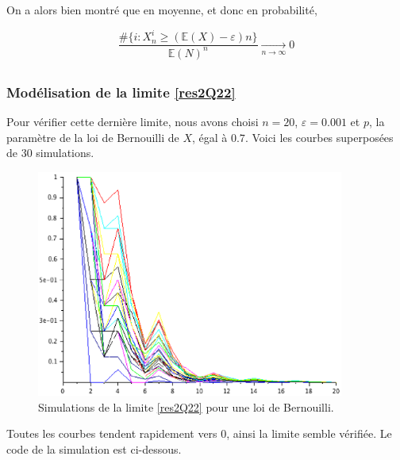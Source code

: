 \documentclass[12pt]{article}
\newcommand{\esp}{\mathbb{E}}
\newcommand{\tend}{\underset{n\to\infty}{\longrightarrow}}
\begin{document}
\begin{itemize}
					On a alors bien montré que en moyenne, et donc en probabilité, 
					
					\begin{equation}
						\boxed{\frac{\# \{i:X_n^i\geqslant(\esp(X)-\varepsilon)n\}}{\esp(N)^n}\tend 0}\label{res2Q22}
					\end{equation}
					
			\end{itemize}
		
		\subsection{} %
			\subsubsection*{Modélisation de la limite \ref{res2Q22}}
				Pour vérifier cette dernière limite, nous avons choisi $n = 20$, $\varepsilon = 0.001$ et $p$, la paramètre de la loi de Bernouilli de $X$, égal à $0.7$. Voici les courbes superposées de 30 simulations. 
		
				\begin{figure}[H]
					\centering
					\caption{Simulations de la limite \ref{res2Q22} pour une loi de Bernouilli.}
					\includegraphics[width=0.9\textwidth]{../Scilab/Images/2_3_1.eps}
				\end{figure}
		
				Toutes les courbes tendent rapidement vers 0, ainsi la limite semble vérifiée. Le code de la simulation est ci-dessous.
		
				\begin{mdframed}[default]
					
				\end{mdframed}
		
\end{document}
